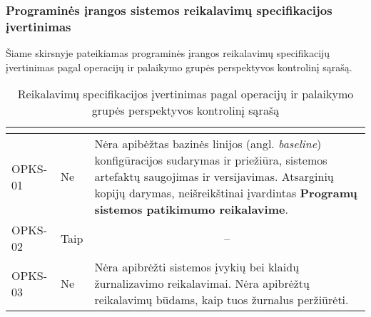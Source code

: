 \documentclass{VUMIFPSkursinis}
\begin{document}
\subsubsection{Programinės įrangos sistemos reikalavimų specifikacijos įvertinimas}

Šiame skirsnyje pateikiamas programinės įrangos reikalavimų specifikacijų įvertinimas pagal operacijų ir palaikymo grupės perspektyvos kontrolinį sąrašą.
\begin{center}

	\begin{longtable}{|C{2cm}|L{2.5cm}|L{10cm}|}

		\caption{Reikalavimų specifikacijos įvertinimas pagal operacijų ir palaikymo grupės perspektyvos kontrolinį sąrašą}
		\label{table:VKS}

		\\ \hline
		 &
		 &
		\\ \hline
		OPKS-01                                         &
		Ne                                              &
		Nėra apibėžtas bazinės linijos (angl. \textit{baseline}) konfigūracijos sudarymas ir priežiūra, sistemos artefaktų saugojimas ir versijavimas. Atsarginių kopijų darymas, neišreikštinai įvardintas \textbf{Programų sistemos patikimumo reikalavime}.             \\ \hline
		OPKS-02                                         &
		Taip                                            &
		                                                                                                                                                                                                                                           \\ \hline
		OPKS-03                                         &
		Ne                                              &
		Nėra apibrėžti sistemos įvykių bei klaidų žurnalizavimo reikalavimai. Nėra apibrėžtų reikalavimų būdams, kaip tuos žurnalus peržiūrėti.                                                                                                                            \\ \hline

\end{longtable}
\end{center}
\end{document}
